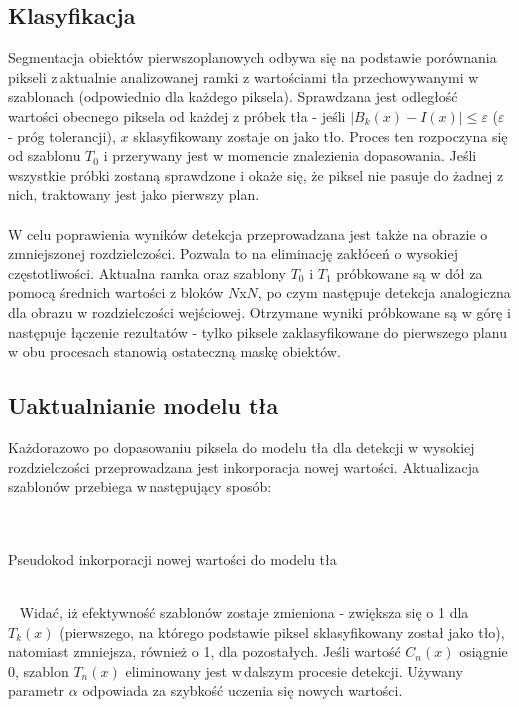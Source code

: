 \subsection{Klasyfikacja}
Segmentacja obiektów pierwszoplanowych odbywa się na podstawie porównania pikseli z\,aktualnie analizowanej ramki z wartościami tła przechowywanymi w szablonach (odpowiednio dla każdego piksela).  Sprawdzana jest odległość wartości obecnego piksela od każdej z próbek tła - jeśli $|B_{k}(x)-I(x)|\leq \varepsilon$ ($\varepsilon$ - próg tolerancji), $x$ sklasyfikowany zostaje on jako tło. Proces ten rozpoczyna się od szablonu $T_{0}$ i przerywany jest w momencie znalezienia dopasowania. Jeśli wszystkie próbki zostaną sprawdzone i okaże się, że piksel nie pasuje do żadnej z nich, traktowany jest jako pierwszy plan.
\paragraph{}
W celu poprawienia wyników detekcja przeprowadzana jest także na obrazie o zmniejszonej rozdzielczości. Pozwala to na eliminację zakłóceń o wysokiej częstotliwości. Aktualna ramka oraz szablony $T_{0}$ i $T_{1}$ próbkowane są w dół za pomocą średnich wartości z bloków $N$x$N$, po czym następuje detekcja analogiczna dla obrazu w rozdzielczości wejściowej. Otrzymane wyniki próbkowane są w górę i następuje łączenie rezultatów - tylko piksele zaklasyfikowane do pierwszego planu w obu procesach stanowią ostateczną maskę obiektów.
\subsection{Uaktualnianie modelu tła}
Każdorazowo po dopasowaniu piksela do modelu tła dla detekcji w wysokiej rozdzielczości przeprowadzana jest inkorporacja nowej wartości. Aktualizacja szablonów przebiega w\,następujący sposób:
\\~\\~
\begin{algorithm}[H]
  
 \caption{Pseudokod inkorporacji nowej wartości do modelu tła}
\end{algorithm}
~\\~
Widać, iż efektywność szablonów zostaje zmieniona - zwiększa się o 1 dla $T_{k}(x)$ (pierwszego, na którego podstawie piksel sklasyfikowany został jako tło), natomiast zmniejsza, również o 1, dla pozostałych. Jeśli wartość $C_{n}(x)$ osiągnie 0, szablon $T_{n}(x)$ eliminowany jest w\,dalszym procesie detekcji. Używany parametr $\alpha$ odpowiada za szybkość uczenia się nowych wartości. 
